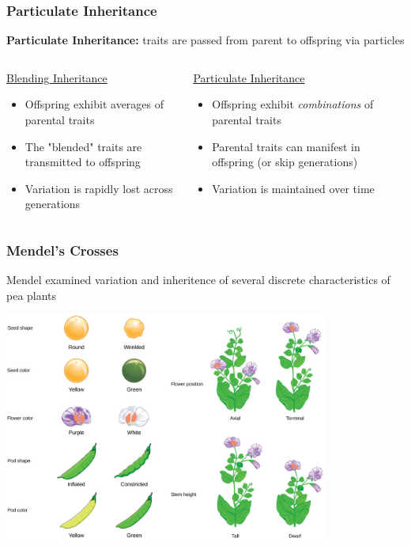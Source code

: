 \documentclass{beamer}
\begin{document}
\begin{frame}
	
	\frametitle{Particulate Inheritance}
\textbf{Particulate Inheritance:} traits are passed from parent to offspring via particles \pause
\vspace{20pt}
\small
\begin{columns}
		\begin{column}{.5\textwidth}
			\underline{Blending Inheritance}
				\begin{itemize}
					\item{Offspring exhibit averages of parental traits}
					\item{The "blended" traits are transmitted to offspring}
					\item{Variation is rapidly lost across generations}
					
				\end{itemize}
			\end{column}
		\begin{column}{.5\textwidth}
			\underline{Particulate Inheritance}
				\begin{itemize}
					\item{Offspring exhibit  \textit{combinations} of parental traits}
					\item{Parental traits can manifest in offspring (or skip generations)}
					\item{Variation is maintained over time}					
				\end{itemize}
			\end{column}
	\end{columns}
	
\end{frame}




\begin{frame}
	\frametitle{Mendel's Crosses}
	\centering
	Mendel examined variation and inheritence of several discrete characteristics of pea plants
	\vspace{10pt}

			\includegraphics[keepaspectratio, width  =0.8\textwidth]{img/mendelCross_2}
\end{frame}
\end{document}
